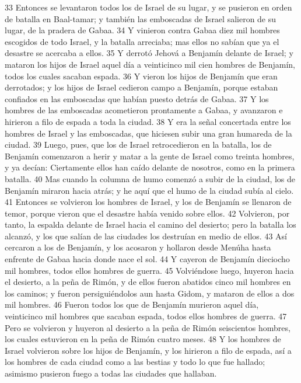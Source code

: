 33 Entonces se levantaron todos los de Israel de su lugar, y se pusieron en orden de batalla en Baal-tamar; y también las emboscadas de Israel salieron de su lugar, de la pradera de Gabaa.
34 Y vinieron contra Gabaa diez mil hombres escogidos de todo Israel, y la batalla arreciaba; mas ellos no sabían que ya el desastre se acercaba a ellos.
35 Y derrotó Jehová a Benjamín delante de Israel; y mataron los hijos de Israel aquel día a veinticinco mil cien hombres de Benjamín, todos los cuales sacaban espada.
36 Y vieron los hijos de Benjamín que eran derrotados; y los hijos de Israel cedieron campo a Benjamín, porque estaban confiados en las emboscadas que habían puesto detrás de Gabaa.
37 Y los hombres de las emboscadas acometieron prontamente a Gabaa, y avanzaron e hirieron a filo de espada a toda la ciudad.
38 Y era la señal concertada entre los hombres de Israel y las emboscadas, que hiciesen subir una gran humareda de la ciudad.
39 Luego, pues, que los de Israel retrocedieron en la batalla, los de Benjamín comenzaron a herir y matar a la gente de Israel como treinta hombres, y ya decían: Ciertamente ellos han caído delante de nosotros, como en la primera batalla.
40 Mas cuando la columna de humo comenzó a subir de la ciudad, los de Benjamín miraron hacia atrás; y he aquí que el humo de la ciudad subía al cielo.
41 Entonces se volvieron los hombres de Israel, y los de Benjamín se llenaron de temor, porque vieron que el desastre había venido sobre ellos.
42 Volvieron, por tanto, la espalda delante de Israel hacia el camino del desierto; pero la batalla los alcanzó, y los que salían de las ciudades los destruían en medio de ellos.
43 Así cercaron a los de Benjamín, y los acosaron y hollaron desde Menúha hasta enfrente de Gabaa hacia donde nace el sol. 
44 Y cayeron de Benjamín dieciocho mil hombres, todos ellos hombres de guerra.
45 Volviéndose luego, huyeron hacia el desierto, a la peña de Rimón, y de ellos fueron abatidos cinco mil hombres en los caminos; y fueron persiguiéndolos aun hasta Gidom, y mataron de ellos a dos mil hombres.
46 Fueron todos los que de Benjamín murieron aquel día, veinticinco mil hombres que sacaban espada, todos ellos hombres de guerra.
47 Pero se volvieron y huyeron al desierto a la peña de Rimón seiscientos hombres, los cuales estuvieron en la peña de Rimón cuatro meses.
48 Y los hombres de Israel volvieron sobre los hijos de Benjamín, y los hirieron a filo de espada, así a los hombres de cada ciudad como a las bestias y todo lo que fue hallado; asimismo pusieron fuego a todas las ciudades que hallaban.

